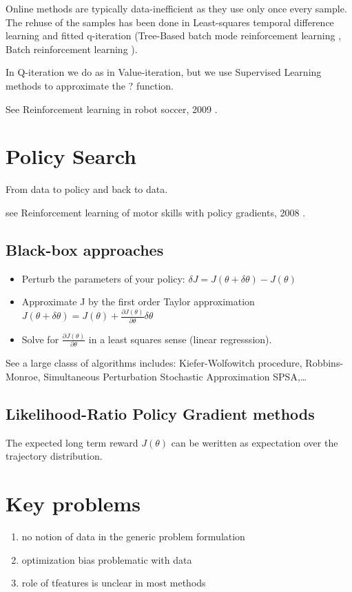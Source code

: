 Online methods are typically data-inefficient as they use only once every
sample. The rehuse of the samples has been done in Least-squares temporal
difference learning and fitted q-iteration (Tree-Based batch mode reinforcement
learning \cite{ernst2005tree}, Batch reinforcement learning
\cite{lange2012batch}).

In Q-iteration we do as in Value-iteration, but we use Supervised Learning
methods to approximate the ? function.

See Reinforcement learning in robot soccer, 2009
\cite{riedmiller2009reinforcement}.


\section{Policy Search}

From data to policy and back to data.

see Reinforcement learning of motor skills with policy gradients, 2008
\cite{peters2008reinforcement}.

\subsection{Black-box approaches}


\begin{itemize}
  \item Perturb the parameters of your policy: $\delta J = J(\theta + \delta
    \theta) - J(\theta)$
  \item Approximate J by the first order Taylor approximation $J(\theta +
    \delta\theta) = J(\theta) + \frac{\partial
    J(\theta)}{\partial\theta}\delta\theta$
  \item Solve for $\frac{\partial J(\theta)}{\partial \theta}$ in a least
    squares sense (linear regresssion).
\end{itemize}

See a large classs of algorithms includes: Kiefer-Wolfowitch procedure,
Robbins-Monroe, Simultaneous Perturbation Stochastic Approximation SPSA,\dots

\subsection{Likelihood-Ratio Policy Gradient methods}

The expected long term reward $J(\theta)$ can be weritten as expectation over
the trajectory distribution.

\section{Key problems}

\begin{enumerate}
  \item no notion of data in the generic problem formulation
  \item optimization bias problematic with data
  \item role of tfeatures is unclear in most methods
\end{enumerate}


